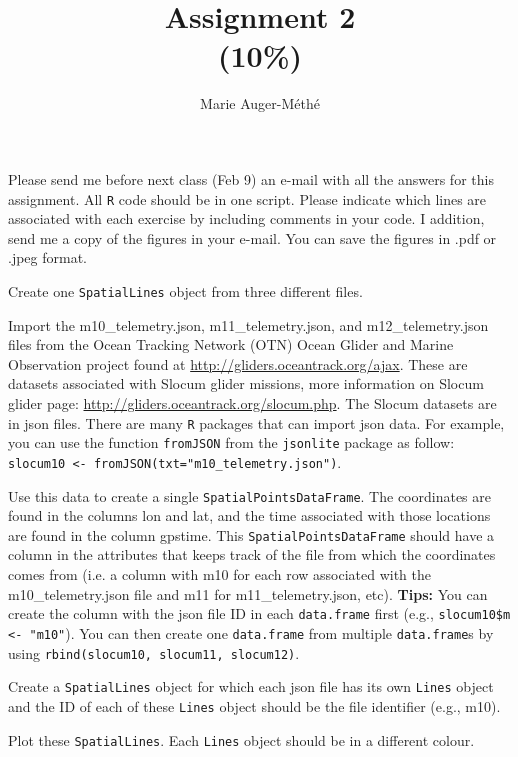 \documentclass[11pt, oneside]{article}   	%
\title{Assignment 2 \\ \large(10\%)}
\author{Marie Auger-M\'eth\'e}
\date{}							%
\begin{document}
\maketitle

Please send me before next class (Feb 9) an e-mail with all the answers for this assignment. All \texttt{R} code should be in one script. Please indicate which lines are associated with each exercise by including comments in your code. I addition, send me a copy of the figures in your e-mail. You can save the figures in .pdf or .jpeg format.

\begin{Exercise}

Create one \texttt{SpatialLines} object from three different files.

\Question
Import the m10\_telemetry.json, m11\_telemetry.json, and m12\_telemetry.json files from the Ocean Tracking Network (OTN) Ocean Glider and Marine Observation project found at \url{http://gliders.oceantrack.org/ajax}. These are datasets associated with Slocum glider missions, more information on Slocum glider page: \url{http://gliders.oceantrack.org/slocum.php}. The Slocum datasets are in json files. There are many \texttt{R} packages that can import json data. For example, you can use the function \texttt{fromJSON} from the \texttt{jsonlite} package as follow: \texttt{slocum10 <- fromJSON(txt="m10\_telemetry.json")}.

\Question Use this data to create a single \texttt{SpatialPointsDataFrame}. The coordinates are found in the columns lon and lat, and the time associated with those locations are found in the column gpstime. This \texttt{SpatialPointsDataFrame} should have a column in the attributes that keeps track of the file from which the coordinates comes from (i.e. a column with m10 for each row associated with the m10\_telemetry.json file and m11 for m11\_telemetry.json, etc). \textbf{Tips:} You can create the column with the json file ID in each \texttt{data.frame} first (e.g., \texttt{slocum10\$m <- "m10"}). You can then create one \texttt{data.frame} from multiple \texttt{data.frame}s by using \texttt{rbind(slocum10, slocum11, slocum12)}. 

\Question Create a \texttt{SpatialLines} object for which each json file has its own \texttt{Lines} object and the ID of each of these \texttt{Lines} object should be the file identifier (e.g., m10). 

\Question Plot these \texttt{SpatialLines}. Each \texttt{Lines} object  should be in a different colour.

\end{Exercise}
\end{document}
